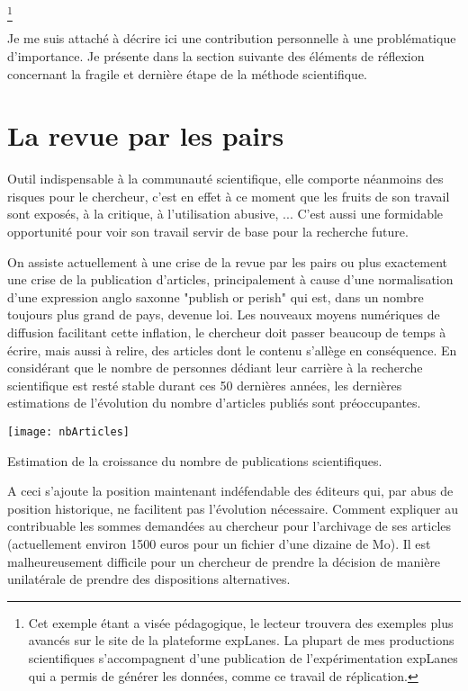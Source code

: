 

\footnote{Cet exemple étant a visée pédagogique, le lecteur trouvera des exemples plus avancés sur le site de la plateforme expLanes. La plupart de mes productions scientifiques s'accompagnent d'une publication de l'expérimentation expLanes qui a permis de générer les données, comme ce travail de réplication\cite{lagrange2015}.}

Je me suis attaché à décrire ici une contribution personnelle à une problématique d'importance. Je présente dans la section suivante des éléments de réflexion concernant la fragile et dernière étape de la méthode scientifique.

\section{\nmu La revue par les pairs} \label{sec:pairs}

Outil indispensable à la communauté scientifique, elle comporte néanmoins des risques pour le chercheur, c'est en effet à ce moment que les fruits de son travail sont exposés, à la critique, à l'utilisation abusive, ... C'est aussi une formidable opportunité pour voir son travail servir de base pour la recherche future.

On assiste actuellement à une \og crise \fg de la revue par les pairs ou plus exactement une crise de la publication d'articles, principalement à cause d'une normalisation d'une expression anglo saxonne "publish or perish" qui est, dans un nombre toujours plus grand de pays, devenue loi. Les nouveaux moyens numériques de diffusion facilitant cette inflation, le chercheur doit passer beaucoup de temps à écrire, mais aussi à relire, des articles dont le contenu s'allège en conséquence. En considérant que le nombre de personnes dédiant leur carrière à la recherche scientifique est resté stable durant ces 50 dernières années, les dernières estimations de l'évolution du nombre d'articles publiés sont préoccupantes\cite{bornmann2015growth}.

\begin{marginfigure}
  \texttt{[image: nbArticles]}
  \caption{Estimation de la croissance du nombre de publications scientifiques.}
\end{marginfigure}

A ceci s'ajoute la position maintenant indéfendable des éditeurs qui, par abus de position historique, ne facilitent pas l'évolution nécessaire. Comment expliquer au contribuable les sommes demandées au chercheur pour l'archivage de ses articles (actuellement environ 1500 euros pour un fichier d'une dizaine de Mo). Il est malheureusement difficile pour un chercheur de prendre la décision de manière unilatérale de prendre des dispositions alternatives.

